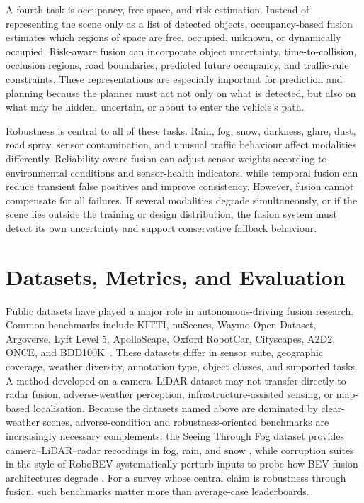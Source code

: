 \documentclass[11pt,oneside,openany]{book}
\newcommand{\addednew}[1]{\textcolor{RevisionOlive}{#1}}
\begin{document}
A fourth task is occupancy, free-space, and risk estimation. Instead of representing the scene only as a list of detected objects, occupancy-based fusion estimates which regions of space are free, occupied, unknown, or dynamically occupied. Risk-aware fusion can incorporate object uncertainty, time-to-collision, occlusion regions, road boundaries, predicted future occupancy, and traffic-rule constraints. These representations are especially important for prediction and planning because the planner must act not only on what is detected, but also on what may be hidden, uncertain, or about to enter the vehicle's path.

Robustness is central to all of these tasks. Rain, fog, snow, darkness, glare, dust, road spray, sensor contamination, and unusual traffic behaviour affect modalities differently. Reliability-aware fusion can adjust sensor weights according to environmental conditions and sensor-health indicators, while temporal fusion can reduce transient false positives and improve consistency. However, fusion cannot compensate for all failures. If several modalities degrade simultaneously, or if the scene lies outside the training or design distribution, the fusion system must detect its own uncertainty and support conservative fallback behaviour.

\section{Datasets, Metrics, and Evaluation}

Public datasets have played a major role in autonomous-driving fusion research. Common benchmarks include KITTI, nuScenes, Waymo Open Dataset, Argoverse, Lyft Level 5, ApolloScape, Oxford RobotCar, Cityscapes, A2D2, ONCE, and BDD100K\addednew{~\cite{geiger2013_kitti,caesar2020_nuscenes,sun2020_waymo,chang2019_argoverse,cordts2016_cityscapes,yu2020_bdd100k}}. These datasets differ in sensor suite, geographic coverage, weather diversity, annotation type, object classes, and supported tasks. A method developed on a camera--LiDAR dataset may not transfer directly to radar fusion, adverse-weather perception, infrastructure-assisted sensing, or map-based localisation. \addednew{Because the datasets named above are dominated by clear-weather scenes, adverse-condition and robustness-oriented benchmarks are increasingly necessary complements: the Seeing Through Fog dataset provides camera--LiDAR--radar recordings in fog, rain, and snow \cite{bijelic2020_stf}, while corruption suites in the style of RoboBEV systematically perturb inputs to probe how BEV fusion architectures degrade \cite{dong2023_robobev}. For a survey whose central claim is robustness through fusion, such benchmarks matter more than average-case leaderboards.} %
\end{document}
